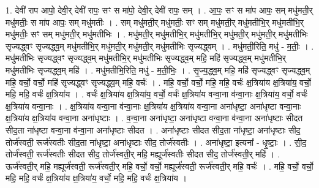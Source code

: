 \documentclass[17pt]{extarticle}
\begin{document}
1. देवी॑ राप आपो॒ देवी॒र् देवी॑ रापः॒ सꣳ स मा॑पो॒ देवी॒र् देवी॑ रापः॒ सम् । . आ॒पः॒ सꣳ स मा॑प आपः॒ सम् मधु॑मती॒र् मधु॑मतीः॒ स मा॑प आपः॒ सम् मधु॑मतीः । . सम् मधु॑मती॒र् मधु॑मतीः॒ सꣳ सम् मधु॑मती॒र् मधु॑मतीभि॒र् मधु॑मतीभि॒र् मधु॑मतीः॒ सꣳ सम् मधु॑मती॒र् मधु॑मतीभिः । . मधु॑मती॒र् मधु॑मतीभि॒र् मधु॑मतीभि॒र् मधु॑मती॒र् मधु॑मती॒र् मधु॑मतीभिः सृज्यद्ध्वꣳ सृज्यद्ध्व॒म् मधु॑मतीभि॒र् मधु॑मती॒र् मधु॑मती॒र् मधु॑मतीभिः सृज्यद्ध्वम् । . मधु॑मती॒रिति॒ मधु॑ - म॒तीः॒ । . मधु॑मतीभिः सृज्यद्ध्वꣳ सृज्यद्ध्व॒म् मधु॑मतीभि॒र् मधु॑मतीभिः सृज्यद्ध्व॒म् महि॒ महि॑ सृज्यद्ध्व॒म् मधु॑मतीभि॒र् मधु॑मतीभिः सृज्यद्ध्व॒म् महि॑ । . मधु॑मतीभि॒रिति॒ मधु॑ - म॒ती॒भिः॒ । . सृ॒ज्य॒द्ध्व॒म् महि॒ महि॑ सृज्यद्ध्वꣳ सृज्यद्ध्व॒म् महि॒ वर्चो॒ वर्चो॒ महि॑ सृज्यद्ध्वꣳ सृज्यद्ध्व॒म् महि॒ वर्चः॑ । . महि॒ वर्चो॒ वर्चो॒ महि॒ महि॒ वर्चः॑ क्ष॒त्रिया॑य क्ष॒त्रिया॑य॒ वर्चो॒ महि॒ महि॒ वर्चः॑ क्ष॒त्रिया॑य । . वर्चः॑ क्ष॒त्रिया॑य क्ष॒त्रिया॑य॒ वर्चो॒ वर्चः॑ क्ष॒त्रिया॑य वन्वा॒ना व॑न्वा॒नाः क्ष॒त्रिया॑य॒ वर्चो॒ वर्चः॑ क्ष॒त्रिया॑य वन्वा॒नाः । . क्ष॒त्रिया॑य वन्वा॒ना व॑न्वा॒नाः क्ष॒त्रिया॑य क्ष॒त्रिया॑य वन्वा॒ना अना॑धृष्टा॒ अना॑धृष्टा वन्वा॒नाः क्ष॒त्रिया॑य क्ष॒त्रिया॑य वन्वा॒ना अना॑धृष्टाः । . व॒न्वा॒ना अना॑धृष्टा॒ अना॑धृष्टा वन्वा॒ना व॑न्वा॒ना अना॑धृष्टाः सीदत सीद॒ता ना॑धृष्टा वन्वा॒ना व॑न्वा॒ना अना॑धृष्टाः सीदत । . अना॑धृष्टाः सीदत सीद॒ता ना॑धृष्टा॒ अना॑धृष्टाः सीद॒ तोर्ज॑स्वती॒ रूर्ज॑स्वतीः सीद॒ता ना॑धृष्टा॒ अना॑धृष्टाः सीद॒ तोर्ज॑स्वतीः । . अना॑धृष्टा॒ इत्यना᳚ - धृ॒ष्टाः॒ । . सी॒द॒ तोर्ज॑स्वती॒ रूर्ज॑स्वतीः सीदत सीद॒ तोर्ज॑स्वती॒र् महि॒ मह्यूर्ज॑स्वतीः सीदत सीद॒ तोर्ज॑स्वती॒र् महि॑ । . ऊर्ज॑स्वती॒र् महि॒ मह्यूर्ज॑स्वती॒ रूर्ज॑स्वती॒र् महि॒ वर्चो॒ वर्चो॒ मह्यूर्ज॑स्वती॒ रूर्ज॑स्वती॒र् महि॒ वर्चः॑ । . महि॒ वर्चो॒ वर्चो॒ महि॒ महि॒ वर्चः॑ क्ष॒त्रिया॑य क्ष॒त्रिया॑य॒ वर्चो॒ महि॒ महि॒ वर्चः॑ क्ष॒त्रिया॑य । \newline
\end{document}
